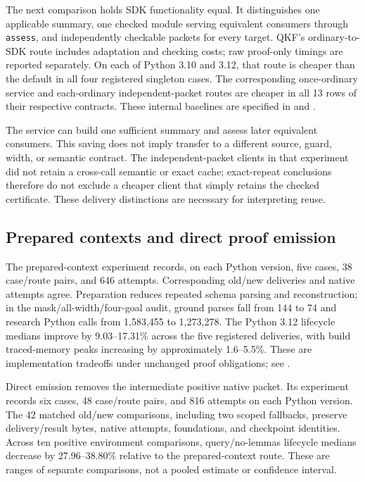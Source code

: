 The next comparison holds SDK functionality equal. It distinguishes one applicable summary, one checked module serving equivalent consumers through \texttt{assess}, and independently checkable packets for every target. QKF's ordinary-to-SDK route includes adaptation and checking costs; raw proof-only timings are reported separately. On each of Python 3.10 and 3.12, that route is cheaper than the default in all four registered singleton cases. The corresponding once-ordinary service and each-ordinary independent-packet routes are cheaper in all 13 rows of their respective contracts. These internal baselines are specified in  and .

The service can build one sufficient summary and assess later equivalent consumers. This saving does not imply transfer to a different source, guard, width, or semantic contract. The independent-packet clients in that experiment did not retain a cross-call semantic or exact cache; exact-repeat conclusions therefore do not exclude a cheaper client that simply retains the checked certificate. These delivery distinctions are necessary for interpreting reuse.

\subsection{Prepared contexts and direct proof emission}
The prepared-context experiment records, on each Python version, five cases, 38 case/route pairs, and 646 attempts. Corresponding old/new deliveries and native attempts agree. Preparation reduces repeated schema parsing and reconstruction; in the mask/all-width/four-goal audit, ground parses fall from 144 to 74 and research Python calls from 1,583,455 to 1,273,278. The Python 3.12 lifecycle medians improve by 9.03--17.31\% across the five registered deliveries, with build traced-memory peaks increasing by approximately 1.6--5.5\%. These are implementation tradeoffs under unchanged proof obligations; see .

Direct emission removes the intermediate positive native packet. Its experiment records six cases, 48 case/route pairs, and 816 attempts on each Python version. The 42 matched old/new comparisons, including two scoped fallbacks, preserve delivery/result bytes, native attempts, foundations, and checkpoint identities. Across ten positive environment comparisons, query/no-lemmas lifecycle medians decrease by 27.96--38.80\% relative to the prepared-context route. These are ranges of separate comparisons, not a pooled estimate or confidence interval.

